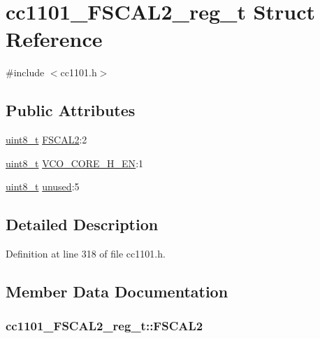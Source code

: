 \hypertarget{structcc1101___f_s_c_a_l2__reg__t}{}\section{cc1101\+\_\+\+F\+S\+C\+A\+L2\+\_\+reg\+\_\+t Struct Reference}
\label{structcc1101___f_s_c_a_l2__reg__t}


{\ttfamily \#include $<$cc1101.\+h$>$}

\subsection*{Public Attributes}
\begin{DoxyCompactItemize}
\item 
\hyperlink{_p_e___types_8h_aba7bc1797add20fe3efdf37ced1182c5}{uint8\+\_\+t} \hyperlink{structcc1101___f_s_c_a_l2__reg__t_a439cfd53aaba786048a60c789bd99cf9}{F\+S\+C\+A\+L2}\+:2
\item 
\hyperlink{_p_e___types_8h_aba7bc1797add20fe3efdf37ced1182c5}{uint8\+\_\+t} \hyperlink{structcc1101___f_s_c_a_l2__reg__t_ae076a4c5c58c38fd2204f68712506cca}{V\+C\+O\+\_\+\+C\+O\+R\+E\+\_\+\+H\+\_\+\+EN}\+:1
\item 
\hyperlink{_p_e___types_8h_aba7bc1797add20fe3efdf37ced1182c5}{uint8\+\_\+t} \hyperlink{structcc1101___f_s_c_a_l2__reg__t_ad222ed9895da8d51de04035b6e1ef765}{unused}\+:5
\end{DoxyCompactItemize}


\subsection{Detailed Description}


Definition at line 318 of file cc1101.\+h.



\subsection{Member Data Documentation}
\subsubsection[{\texorpdfstring{F\+S\+C\+A\+L2}{FSCAL2}}]{ cc1101\+\_\+\+F\+S\+C\+A\+L2\+\_\+reg\+\_\+t\+::\+F\+S\+C\+A\+L2}\hypertarget{structcc1101___f_s_c_a_l2__reg__t_a439cfd53aaba786048a60c789bd99cf9}{}\label{structcc1101___f_s_c_a_l2__reg__t_a439cfd53aaba786048a60c789bd99cf9}



